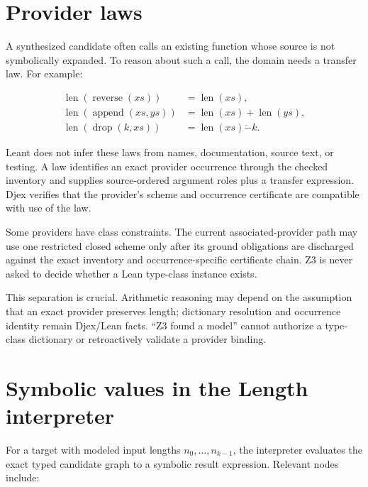 \documentclass[10pt,letterpaper,oneside]{report}
\begin{document}
\section{Provider laws}

A synthesized candidate often calls an existing function whose source is not symbolically expanded. To reason about such a call, the domain needs a transfer law. For example:

\begin{align*}
  \operatorname{len}(\operatorname{reverse}(xs)) &= \operatorname{len}(xs),\\
  \operatorname{len}(\operatorname{append}(xs,ys)) &=
    \operatorname{len}(xs)+\operatorname{len}(ys),\\
  \operatorname{len}(\operatorname{drop}(k,xs)) &=
    \operatorname{len}(xs)\mathbin{\dot{-}}k.
\end{align*}

Leant does not infer these laws from names, documentation, source text, or testing. A law identifies an exact provider occurrence through the checked inventory and supplies source-ordered argument roles plus a transfer expression. Djex verifies that the provider's scheme and occurrence certificate are compatible with use of the law.

Some providers have class constraints. The current associated-provider path may use one restricted closed scheme only after its ground obligations are discharged against the exact inventory and occurrence-specific certificate chain. Z3 is never asked to decide whether a Lean type-class instance exists.

\begin{projectnote}
This separation is crucial. Arithmetic reasoning may depend on the assumption that an exact provider preserves length; dictionary resolution and occurrence identity remain Djex/Lean facts. ``Z3 found a model'' cannot authorize a type-class dictionary or retroactively validate a provider binding.
\end{projectnote}

\section{Symbolic values in the Length interpreter}

For a target with modeled input lengths $n_0,\ldots,n_{k-1}$, the interpreter evaluates the exact typed candidate graph to a symbolic result expression. Relevant nodes include:
\end{document}
